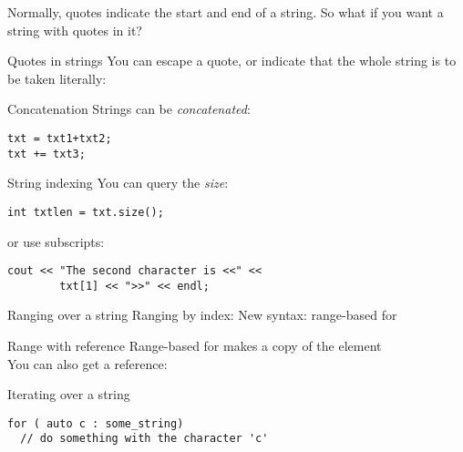 Normally, quotes indicate the start and end of a string. So what if
you want a string with quotes in it?

\begin{block}{Quotes in strings}
  \label{sl:string-quote}
  You can escape a quote, or indicate that the whole string is to be
  taken literally:
\end{block}

\begin{block}{Concatenation}
  \label{sl:string-plus}
  Strings can be \emph{concatenated}:
\begin{lstlisting}
txt = txt1+txt2;
txt += txt3;
\end{lstlisting}
\end{block}

\begin{block}{String indexing}
  \label{sl:string-vector}
  You can query the \emph{size}:
\begin{lstlisting}
int txtlen = txt.size();
\end{lstlisting}
or use subscripts:
\begin{lstlisting}
cout << "The second character is <<" << 
        txt[1] << ">>" << endl;
\end{lstlisting}
\end{block}

\begin{block}{Ranging over a string}
  \label{sl:string-index}
  Ranging by index:
  New syntax: range-based for
\end{block}

\begin{block}{Range with reference}
  \label{sl:string-index-ref}
  Range-based for makes a copy of the element\\
  You can also get a reference:
\end{block}

\begin{block}{Iterating over a string}
\begin{lstlisting}
for ( auto c : some_string)
  // do something with the character 'c'
\end{lstlisting}
\end{block}

